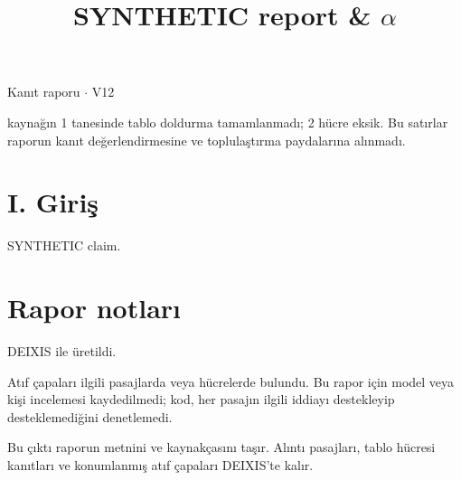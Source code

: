 \documentclass[journal]{IEEEtran}
\begin{document}
\renewcommand{\abstractname}{Özet}
\renewcommand{\IEEEkeywordsname}{Dizin Terimleri}
\renewcommand{\refname}{Kaynaklar}

\title{SYNTHETIC report \& \ensuremath{\alpha}}

\maketitle

\noindent Kanıt raporu \ensuremath{\cdot} V12

 kaynağın 1 tanesinde tablo doldurma tamamlanmadı; 2 hücre eksik. Bu satırlar raporun kanıt değerlendirmesine ve toplulaştırma paydalarına alınmadı.

\section*{I. Giriş}

SYNTHETIC claim. \cite{Synth26}

\section*{Rapor notları}

DEIXIS ile üretildi.

Atıf çapaları ilgili pasajlarda veya hücrelerde bulundu. Bu rapor için model veya kişi incelemesi kaydedilmedi; kod, her pasajın ilgili iddiayı destekleyip desteklemediğini denetlemedi.

Bu çıktı raporun metnini ve kaynakçasını taşır. Alıntı pasajları, tablo hücresi kanıtları ve konumlanmış atıf çapaları DEIXIS'te kalır.




\end{document}
